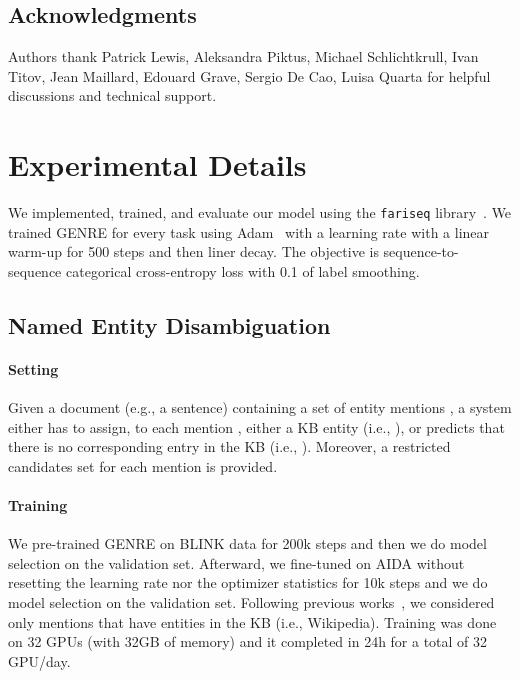 \documentclass{article} \usepackage{main,times}
\makeatletter
\def\genre{\textsc{GENRE}\@\xspace}
\makeatother
\begin{document}
 
\ificlrfinal
\subsection*{Acknowledgments}
Authors thank
Patrick Lewis,
Aleksandra Piktus,
Michael Schlichtkrull,
Ivan Titov,
Jean Maillard,
Edouard Grave,
Sergio De Cao,
Luisa Quarta
for helpful discussions and technical support. \else
\clearpage
\fi




\clearpage
\appendix

\section{Experimental Details}

We implemented, trained, and evaluate our model using the \texttt{fariseq} library~\citep{ott2019fairseq}. We trained \genre for every task using Adam~\citep{kingma2014adam} with a learning rate  with a linear warm-up for 500 steps and then liner decay. The objective is sequence-to-sequence categorical cross-entropy loss with 0.1 of label smoothing.

\subsection{Named Entity Disambiguation} \label{app:hyper_ed}

\paragraph{Setting}
Given a document  (e.g., a sentence) containing a set of entity mentions , a system either has to assign, to each mention , either a KB entity (i.e., ), or predicts that there is no corresponding entry in the KB (i.e., ). Moreover, a restricted candidates set  for each mention  is provided.


\paragraph{Training}
We pre-trained \genre on BLINK data for 200k steps and then we do model selection on the validation set. Afterward, we fine-tuned on AIDA without resetting the learning rate nor the optimizer statistics for 10k steps and we do model selection on the validation set. Following previous works~\citep{yamada-etal-2016-joint, ganea-hofmann-2017-deep, le-titov-2018-improving}, we considered only mentions that have entities in the KB (i.e., Wikipedia). Training was done on 32 GPUs (with 32GB of memory) and it completed in 24h for a total of 32 GPU/day.
\end{document}
